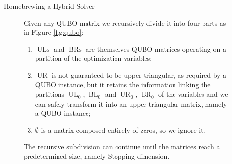 \documentclass[final]{beamer}
\newlength{\colwidth}
\begin{document}
\begin{frame}[t,fragile]
\begin{columns}[t]
\begin{column}{\colwidth}
\begin{block}{Homebrewing a Hybrid Solver}
    \begin{figure}[h!]
      \centering
      \begin{minipage}{0.55\textwidth}
        Given any QUBO matrix we recursively divide it into four parts as in Figure \ref{fig:qubo}:
        \begin{enumerate}
            \item $\operatorname{ULs}$ and $\operatorname{BRs}$ are themselves QUBO matrices operating on a partition of the optimization variables;
            \item $\operatorname{UR}$ is not guaranteed to be upper triangular, as required by a QUBO instance, but it retains the information linking the partitions $\operatorname{UL}_0$, $\operatorname{BL}_0$ and $\operatorname{UR}_0$, $\operatorname{BR}_0$ of the variables and we can safely transform it into an upper triangular matrix, namely a QUBO instance;
            \item $\emptyset$ is a matrix composed entirely of zeros, so we ignore it.
        \end{enumerate}

        The recursive subdivision can continue until the matrices reach a predetermined size, namely Stopping dimension.
      \end{minipage}%
      \hfill
      \begin{minipage}{0.4\textwidth}
        \centering
\end{minipage}
\end{figure}
\end{block}
\end{column}
\end{columns}
\end{frame}
\end{document}
